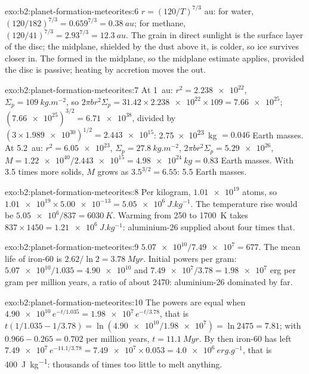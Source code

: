 \begin{solution}{exo:b2:planet-formation-meteorites:6}
$r = (120/T)^{7/3}$ au: for water, $(120/182)^{7/3} = 0.659^{7/3} =
\qty{0.38}{au}$; for methane, $(120/41)^{7/3} = 2.93^{7/3} = \qty{12.3}{au}$.
The grain in direct sunlight is the surface layer of the disc; the midplane,
shielded by the dust above it, is colder, so ice survives closer in. The
 formed in the midplane, so the midplane estimate applies, provided
the disc is passive; heating by accretion moves the  out.
\end{solution}

\begin{solution}{exo:b2:planet-formation-meteorites:7}
At \qty{1}{au}: $r^2 = \num{2.238e22}$, $\Sigma_p = \qty{109}{kg.m^{-2}}$, so
$2\pi b r^2\Sigma_p = 31.42\times\num{2.238e22}\times109 = \num{7.66e25}$;
$(\num{7.66e25})^{3/2} = \num{6.71e38}$, divided by
$(3\times\num{1.989e30})^{1/2} = \num{2.443e15}$: \qty{2.75e23}{kg}
$= 0.046$ Earth masses. At \qty{5.2}{au}: $r^2 = \num{6.05e23}$,
$\Sigma_p = \qty{27.8}{kg.m^{-2}}$, $2\pi b r^2\Sigma_p = \num{5.29e26}$,
$M = \num{1.22e40}/\num{2.443e15} = \qty{4.98e24}{kg} = 0.83$ Earth masses.
With \num{3.5} times more solids, $M$ grows as $3.5^{3/2} = 6.55$: 5.5 Earth
masses.
\end{solution}

\begin{solution}{exo:b2:planet-formation-meteorites:8}
Per kilogram, $\num{1.01e19}$ atoms, so
$\num{1.01e19}\times\num{5.00e-13} = \qty{5.05e6}{J.kg^{-1}}$. The temperature
rise would be $\num{5.05e6}/837 = \qty{6030}{K}$. Warming from \num{250} to
\qty{1700}{K} takes $837\times1450 = \qty{1.21e6}{J.kg^{-1}}$: aluminium-26
supplied about four times that.
\end{solution}

\begin{solution}{exo:b2:planet-formation-meteorites:9}
$\num{5.07e10}/\num{7.49e7} = 677$. The mean life of iron-60 is
$2.62/\ln2 = \qty{3.78}{Myr}$. Initial powers per gram:
$\num{5.07e10}/1.035 = \num{4.90e10}$ and $\num{7.49e7}/3.78 = \num{1.98e7}$ erg per
gram per million years, a ratio of about \num{2470}: aluminium-26 dominated by far.
\end{solution}

\begin{solution}{exo:b2:planet-formation-meteorites:10}
The powers are equal when $\num{4.90e10}\,e^{-t/1.035} = \num{1.98e7}\,e^{-t/3.78}$,
that is $t(1/1.035 - 1/3.78) = \ln(\num{4.90e10}/\num{1.98e7}) = \ln 2475 = 7.81$;
with $0.966 - 0.265 = 0.702$ per million years, $t = \qty{11.1}{Myr}$. By then
iron-60 has left $\num{7.49e7}\,e^{-11.1/3.78} = \num{7.49e7}\times0.053 =
\qty{4.0e6}{erg.g^{-1}}$, that is \qty{400}{J.kg^{-1}}: thousands of times too
little to melt anything.
\end{solution}

